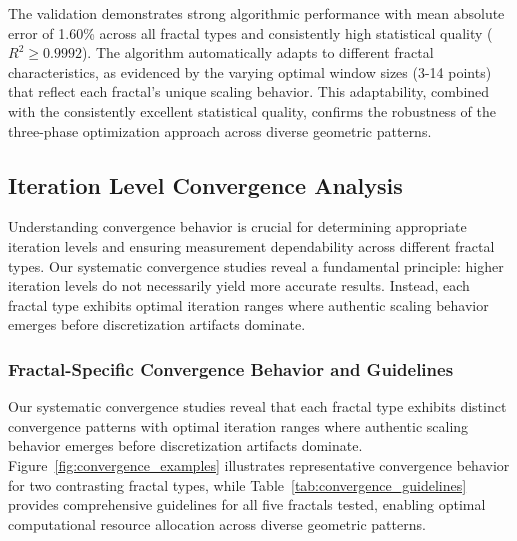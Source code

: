 \documentclass[preprint,12pt]{elsarticle}
\def\textbf#1{#1}%
\begin{document}
The validation demonstrates strong algorithmic performance with mean absolute error of 1.60\% across all fractal types and consistently high statistical quality ($R^2 \geq 0.9992$). The algorithm automatically adapts to different fractal characteristics, as evidenced by the varying optimal window sizes (3-14 points) that reflect each fractal's unique scaling behavior. This adaptability, combined with the consistently excellent statistical quality, confirms the robustness of the three-phase optimization approach across diverse geometric patterns.


\subsection{Iteration Level Convergence Analysis}
\label{subsec:convergence_analysis}

Understanding convergence behavior is crucial for determining appropriate iteration levels and ensuring measurement dependability across different fractal types. Our systematic convergence studies reveal a fundamental principle: \textbf{higher iteration levels do not necessarily yield more accurate results}. Instead, each fractal type exhibits optimal iteration ranges where authentic scaling behavior emerges before discretization artifacts dominate.

\subsubsection{Fractal-Specific Convergence Behavior and Guidelines}

Our systematic convergence studies reveal that each fractal type exhibits distinct convergence patterns with optimal iteration ranges where authentic scaling behavior emerges before discretization artifacts dominate. Figure~\ref{fig:convergence_examples} illustrates representative convergence behavior for two contrasting fractal types, while Table~\ref{tab:convergence_guidelines} provides comprehensive guidelines for all five fractals tested, enabling optimal computational resource allocation across diverse geometric patterns.
\end{document}
